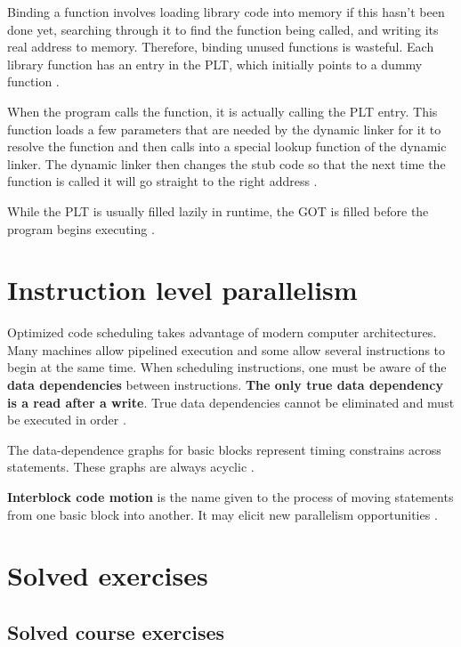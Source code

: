 Binding a function involves loading library code into memory if this hasn't been done yet, searching through it to find the function being called, and writing its real address to memory.
Therefore, binding unused functions is wasteful.
Each library function has an entry in the PLT, which initially points to a dummy function \cite{computer-science-from-the-bottom-up}.

When the program calls the function, it is actually calling the PLT entry.
This function loads a few parameters that are needed by the dynamic linker for it to resolve the function and then calls into a special lookup function of the dynamic linker.
The dynamic linker then changes the stub code so that the next time the function is called it will go straight to the right address \cite{computer-science-from-the-bottom-up}.

While the PLT is usually filled lazily in runtime, the GOT is filled before the program begins executing \cite{computer-science-from-the-bottom-up}.

\section{Instruction level parallelism}

Optimized code scheduling takes advantage of modern computer architectures.
Many machines allow pipelined execution and some allow several instructions to begin at the same time.
When scheduling instructions, one must be aware of the \textbf{data dependencies} between instructions.
\textbf{The only true data dependency is a read after a write}.
True data dependencies cannot be eliminated and must be executed in order \cite[p.~765]{compilers-aho-2007}.

The data-dependence graphs for basic blocks represent timing constrains across statements.
These graphs are always acyclic \cite[p.~765]{compilers-aho-2007}.

\textbf{Interblock code motion} is the name given to the process of moving statements from one basic block into another.
It may elicit new parallelism opportunities \cite[p.~765]{compilers-aho-2007}.

\section{Solved exercises}

\subsection{Solved course exercises}
\setcounter{Exercise}{0}

